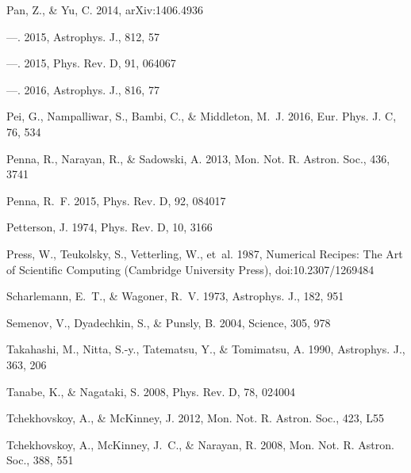 \documentclass[iop,apj]{emulateapj}
\begin{document}
\begin{thebibliography}{}
Pan, Z., \& Yu, C. 2014, arXiv:1406.4936

---. 2015{}, Astrophys. J., 812, 57

---. 2015{}, Phys. Rev. D, 91, 064067

---. 2016, Astrophys. J., 816, 77

Pei, G., Nampalliwar, S., Bambi, C., \& Middleton, M.~J. 2016, Eur. Phys. J. C,
  76, 534

Penna, R., Narayan, R., \& Sadowski, A. 2013, Mon. Not. R. Astron. Soc., 436,
  3741

Penna, R.~F. 2015, Phys. Rev. D, 92, 084017

Petterson, J. 1974, Phys. Rev. D, 10, 3166

Press, W., Teukolsky, S., Vetterling, W., {et~al.} 1987, {Numerical Recipes:
  The Art of Scientific Computing} (Cambridge University Press),
  doi:10.2307/1269484

Scharlemann, E.~T., \& Wagoner, R.~V. 1973, Astrophys. J., 182, 951

Semenov, V., Dyadechkin, S., \& Punsly, B. 2004, Science, 305, 978

Takahashi, M., Nitta, S.-y., Tatematsu, Y., \& Tomimatsu, A. 1990, Astrophys.
  J., 363, 206

Tanabe, K., \& Nagataki, S. 2008, Phys. Rev. D, 78, 024004

Tchekhovskoy, A., \& McKinney, J. 2012, Mon. Not. R. Astron. Soc., 423, L55

Tchekhovskoy, A., McKinney, J.~C., \& Narayan, R. 2008, Mon. Not. R. Astron.
  Soc., 388, 551


\end{thebibliography}
\end{document}
